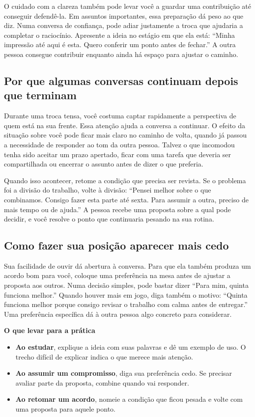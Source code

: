 \documentclass[11pt,a4paper]{article}
\newcommand{\subtituloleitura}[1]{\textbf{#1}\par\nopagebreak[4]}
\begin{document}
O cuidado com a clareza também pode levar você a guardar uma contribuição até conseguir defendê-la. Em assuntos importantes, essa preparação dá peso ao que diz. Numa conversa de confiança, pode adiar justamente a troca que ajudaria a completar o raciocínio. Apresente a ideia no estágio em que ela está: “Minha impressão até aqui é esta. Quero conferir um ponto antes de fechar.” A outra pessoa consegue contribuir enquanto ainda há espaço para ajustar o caminho.

\subsection*{Por que algumas conversas continuam depois que terminam}

Durante uma troca tensa, você costuma captar rapidamente a perspectiva de quem está na sua frente. Essa atenção ajuda a conversa a continuar. O efeito da situação sobre você pode ficar mais claro no caminho de volta, quando já passou a necessidade de responder ao tom da outra pessoa. Talvez o que incomodou tenha sido aceitar um prazo apertado, ficar com uma tarefa que deveria ser compartilhada ou encerrar o assunto antes de dizer o que preferia.

Quando isso acontecer, retome a condição que precisa ser revista. Se o problema foi a divisão do trabalho, volte à divisão: “Pensei melhor sobre o que combinamos. Consigo fazer esta parte até sexta. Para assumir a outra, preciso de mais tempo ou de ajuda.” A pessoa recebe uma proposta sobre a qual pode decidir, e você resolve o ponto que continuaria pesando na sua rotina.

\subsection*{Como fazer sua posição aparecer mais cedo}

Sua facilidade de ouvir dá abertura à conversa. Para que ela também produza um acordo bom para você, coloque uma preferência na mesa antes de ajustar a proposta aos outros. Numa decisão simples, pode bastar dizer “Para mim, quinta funciona melhor.” Quando houver mais em jogo, diga também o motivo: “Quinta funciona melhor porque consigo revisar o trabalho com calma antes de entregar.” Uma preferência específica dá à outra pessoa algo concreto para considerar.

\subtituloleitura{O que levar para a prática}
\begin{itemize}
\item \textbf{Ao estudar}, explique a ideia com suas palavras e dê um exemplo de uso. O trecho difícil de explicar indica o que merece mais atenção.
\item \textbf{Ao assumir um compromisso}, diga sua preferência cedo. Se precisar avaliar parte da proposta, combine quando vai responder.
\item \textbf{Ao retomar um acordo}, nomeie a condição que ficou pesada e volte com uma proposta para aquele ponto.
\end{itemize}
\end{document}
